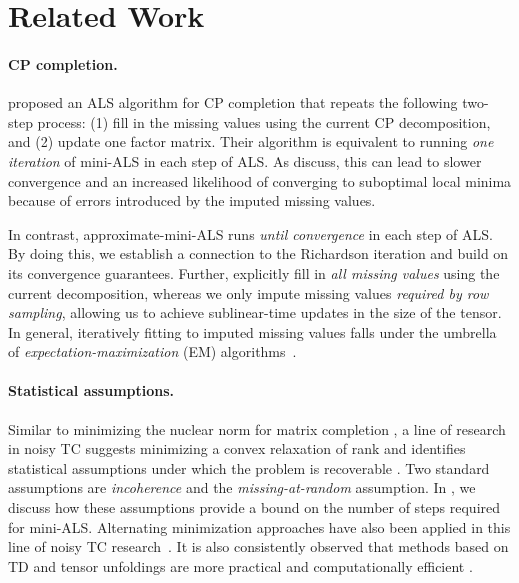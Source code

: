 \section{Related Work}
\label{sec:related-work}

\paragraph{CP completion.}
\citet{tomasi2005parafac} proposed an ALS algorithm for CP completion that repeats the following two-step process:
(1) fill in the missing values using the current CP decomposition, and 
(2) update one factor matrix.
Their algorithm is equivalent to running \emph{one iteration} of mini-ALS in each step of ALS.
As \citet{tomasi2005parafac} discuss, this can lead to slower convergence and an increased likelihood of converging to suboptimal local minima because of errors introduced by the imputed missing values.

In contrast, approximate-mini-ALS runs \emph{until convergence} in each step of ALS.
By doing this, we establish a connection to the Richardson iteration
and build on its convergence guarantees.
Further, \citet{tomasi2005parafac} explicitly fill in \emph{all missing values} using the current decomposition, whereas we only impute missing values \emph{required by row sampling},
allowing us to achieve sublinear-time updates in the size of the tensor.
In general, iteratively fitting to imputed missing values falls under the umbrella of \emph{expectation-maximization} (EM) algorithms~\citep[Chapter 8]{little2019statistical}.

\paragraph{Statistical assumptions.}
Similar to minimizing the nuclear norm for matrix completion \citep{fazel2002matrix, candes2012exact}, a line of research in noisy TC suggests minimizing a convex relaxation of rank and identifies statistical assumptions under which the problem is recoverable \citep{barak2016noisy}.
Two standard assumptions are \emph{incoherence} and the \emph{missing-at-random} assumption. %
In , we discuss how these assumptions provide a bound on the number of steps required for mini-ALS.
Alternating minimization approaches have also been applied
in this line of noisy TC research~\citep{jain2014provable,liu2020tensor}.
It is also consistently observed that methods based on TD and tensor unfoldings are more practical and computationally efficient \citep{acar2011scalable,montanari2018spectral,filipovic2015tucker,shah2019iterative,shah2023robust}.